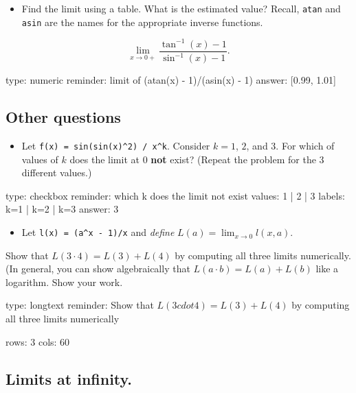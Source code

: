 \documentclass[12pt]{article}
\begin{document}
\begin{itemize}
\itemsep1pt\parskip0pt
\item
  Find the limit using a table. What is the estimated value? Recall,
  \texttt{atan} and \texttt{asin} are the names for the appropriate
  inverse functions.
\end{itemize}

\[
\lim_{x \rightarrow 0+} \frac{\tan^{-1}(x) - 1}{\sin^{-1}(x) - 1}.
\]

\begin{answer}
    type: numeric
    reminder: limit of   (atan(x) - 1)/(asin(x) - 1)
    answer: [0.99, 1.01]

\end{answer}

\subsection{Other questions}

\begin{itemize}
\itemsep1pt\parskip0pt
\item
  Let \texttt{f(x) = sin(sin(x)\^{}2) / x\^{}k}. Consider $k=1$, $2$,
  and $3$. For which of values of $k$ does the limit at $0$ \textbf{not}
  exist? (Repeat the problem for the 3 different values.)
\end{itemize}

\begin{answer}
type: checkbox
reminder: which k does the limit not exist
values: 1 | 2 | 3
labels: k=1 | k=2 | k=3
answer: 3
\end{answer}

\begin{itemize}
\itemsep1pt\parskip0pt
\item
  Let \texttt{l(x) = (a\^{}x - 1)/x} and \emph{define}
  $L(a) = \lim_{x\rightarrow 0} l(x,a)$.
\end{itemize}

Show that $L(3 \cdot 4) = L(3) + L(4)$ by computing all three limits
numerically. (In general, you can show algebraically that
$L(a\cdot b) = L(a) + L(b)$ like a logarithm. Show your work.

\begin{answer}
type: longtext
reminder: Show that \( L(3 cdot 4) = L(3) + L(4) \) by computing all three limits numerically

rows: 3
cols: 60
\end{answer}

\subsection{Limits at infinity.}
\end{document}
